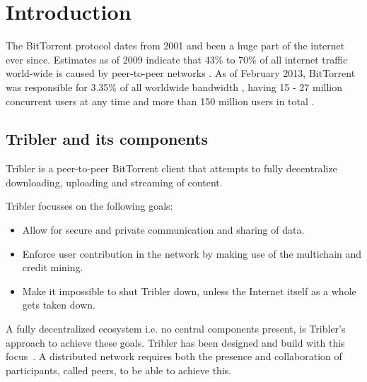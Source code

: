\chapter{Introduction}
\label{chp:introduction}

The BitTorrent protocol dates from 2001 \cite{Cohen2001BitTorrent} and been a huge part of the internet ever since.
Estimates as of 2009 indicate that 43\% to 70\% of all internet traffic world-wide is caused by peer-to-peer networks \cite{schulze2009internet}.
As of February 2013, BitTorrent was responsible for 3.35\% of all worldwide bandwidth \cite{palo2013application}, having 15 - 27 million concurrent users at any time \cite{wang2013measuring} and more than 150 million users in total \cite{reuters2012bittorrent}.

\section{Tribler and its components}
Tribler is a peer-to-peer BitTorrent client that attempts to fully decentralize downloading, uploading and streaming of content.

Tribler focusses on the following goals:
\begin{itemize}
    \item Allow for secure and private communication and sharing of data.
    \item Enforce user contribution in the network by making use of the multichain and credit mining.
    \item Make it impossible to shut Tribler down, unless the Internet itself as a whole gets taken down.
\end{itemize}

A fully decentralized ecosystem i.e. no central components present, is Tribler's approach to achieve these goals.
Tribler has been designed and build with this focus~\cite{Pouwelse-tribler,Bakker-tribler}.
A distributed network requires both the presence and collaboration of participants, called peers, to be able to achieve this.


